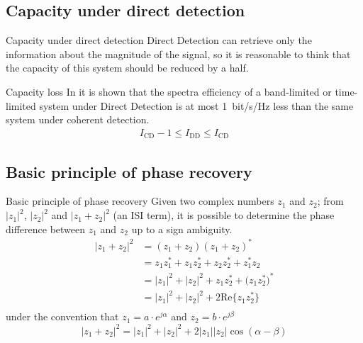 \documentclass[en]{sdqbeamer}
\begin{document}
\subsection{Capacity under direct detection}
\begin{frame}{Capacity under direct detection}{}
Direct Detection can retrieve only the information about the magnitude of the signal, so it is reasonable to think that the capacity of this system should be reduced by a half.
\begin{greenblock}{Capacity loss}
In \cite{Mecozzi_2018,Tasbihi_Capacity} it is shown that the spectra efficiency of a band-limited or time-limited system under Direct Detection  is at most \SI{1}{bit/\s/\Hz} less than the same system under coherent detection.
\begin{align}
	I_\text{CD}-1\leq I_\text{DD}\leq I_\text{CD}
\end{align}

\end{greenblock}

\end{frame}



\subsection{Basic principle of phase recovery}
\begin{frame}{Basic principle of phase recovery}{}
Given two complex numbers $z_1$ and $z_2$; from $|z_1|^2$, $|z_2|^2$ and $|z_1+z_2|^2$ (an ISI term), it is possible to determine the phase difference between $z_1$ and $z_2$ up to a sign ambiguity.
\begin{align*}
	|z_1+z_2|^2 &= (z_1+z_2)(z_1+z_2)^* \\
	&=z_1z_1^*+z_1z_2^*+z_2z_2^*+z_1^*z_2\\
	&=|z_1|^2+|z_2|^2+z_1z_2^*+\bigl(z_1z_2^*\bigr)^*\\
	&=|z_1|^2+|z_2|^2+2\text{Re}\{z_1z_2^*\}\\
\end{align*}%
under the convention that $z_1 = a\cdot e^{j\alpha}$ and $z_2 = b\cdot e^{j\beta}$%
\begin{equation}
	|z_1+z_2|^2 =|z_1|^2+|z_2|^2+2|z_1||z_2|\cos(\alpha-\beta)
	\label{eq:square_mag_of_sum}
\end{equation}

\end{frame}
\end{document}
